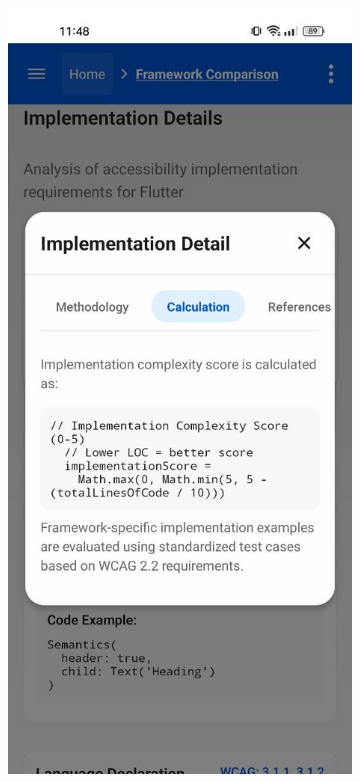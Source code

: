 \begin{figure}[ht]
    \centering
    \begin{subfigure}[b]{0.48\textwidth}
        \centering
        \includegraphics[width=\linewidth, alt={Implementation Details tab showing feature comparisons}]{img/implementation-calculation.jpg}

\end{subfigure}
\end{figure}
